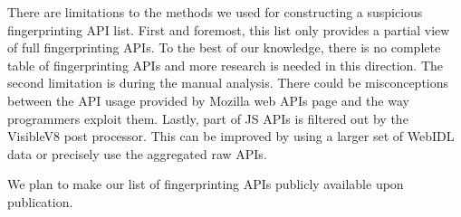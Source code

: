 There are limitations to the methods we used for constructing a suspicious fingerprinting API list. First and foremost, this list only provides a partial view of full fingerprinting APIs. To the best of our knowledge, there is no complete table of fingerprinting APIs and more research is needed in this direction. The second limitation is during the manual analysis. There could be misconceptions between the API usage provided by Mozilla web APIs page and the way programmers exploit them. Lastly, part of JS APIs is filtered out by the VisibleV8 post processor. This can be improved by using a larger set of WebIDL data or precisely use the aggregated raw APIs. 

We plan to make our list of fingerprinting APIs publicly available upon publication.